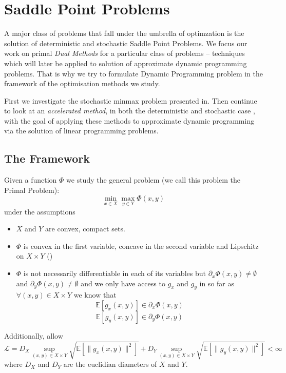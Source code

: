 \documentclass[12pt,reqno]{amsart}
\numberwithin{equation}{section}
\newcommand{\eqnum}{\refstepcounter{equation}\textup{(\tagform{\theequation})}}
\begin{document}
\section{Saddle Point Problems}

A major class of problems that fall under the umbrella of optimzation is the solution of deterministic and stochastic Saddle Point Problems. We focus our work on primal \emph{Dual Methods} for a particular class of problems -- techniques which will later be applied to solution of approximate dynamic programming problems.
That is why we try to formulate Dynamic Programming problem in the framework of the optimisation methods we study.

First we investigate the stochastic minmax problem presented in\cite{NemirovskiRubinstein}. Then continue to look at an \emph{accelerated method}, in both the deterministic \cite{ChambollePock} and stochastic case \cite{ChenLanOuyang}, with the goal of applying these methods to approximate dynamic programming via the solution of linear programming problems.

\subsection{The Framework}

Given a function $\Phi$ we study the general problem (we call this problem the Primal Problem):
$$
\min_{x \in X}\max_{y \in Y} \Phi(x,y)
$$
under the assumptions

\begin{itemize}
\item $X$ and $Y$ are convex, compact sets.
\item $\Phi$ is convex in the first variable, concave in the second variable and Lipschitz on $X \times Y$ \eqnum\label{primal_ass}
\item $\Phi$ is not necessarily differentiable in each of its variables but $\partial_{x} \Phi(x,y) \neq  \emptyset $ and $\partial_{y} \Phi(x,y) \neq  \emptyset $
and we only have access to $g_{x}$ and $g_{y}$ in so far as $\forall (x,y) \in X \times Y$ we know that
$$\mathbb{E}[g_{x}(x,y)] \in \partial_{x} \Phi(x,y) $$
$$\mathbb{E}[g_{y}(x,y)] \in \partial_{y} \Phi(x,y) $$
\end{itemize}
Additionally, allow
$$
\mathcal{L} = D_{X} \sup_{(x,y) \in X \times Y} \sqrt{\mathbb{E}[\lVert g_{x}(x,y) \rVert^{2}]}+ D_{Y} \sup_{(x,y) \in X \times Y}\sqrt{\mathbb{E}[\lVert g_{y}(x,y) \rVert^{2}]} < \infty
$$
where $D_{X}$ and $D_{Y}$ are the euclidian diameters of $X$ and $Y$.
\end{document}
